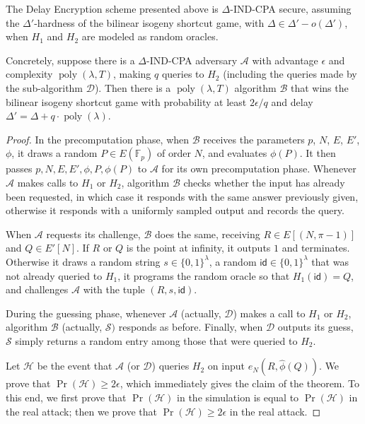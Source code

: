\documentclass{llncs}
\newcommand{\F}{\mathbb{F}}
\DeclareMathOperator{\poly}{poly}
\newcommand{\id}{\mathsf{id}}
\begin{document}
\begin{theorem}
  The Delay Encryption scheme presented above is $\Delta$-IND-CPA
  secure, assuming the $\Delta'$-hardness of the bilinear isogeny
  shortcut game, with $\Delta\in\Delta' - o(\Delta')$, when $H_1$ and
  $H_2$ are modeled as random oracles.

  Concretely, suppose there is a $\Delta$-IND-CPA adversary
  $\mathcal{A}$ with advantage $\epsilon$ and complexity $\poly(\lambda,T)$,
  making $q$ queries
  to $H_2$ (including the queries made by the sub-algorithm
  $\mathcal{D}$). Then there is a $\poly(\lambda,T)$ algorithm $\mathcal{B}$
  that wins the bilinear isogeny shortcut game with probability at
  least $2\epsilon/q$ and delay $\Delta' = \Delta + q\cdot\poly(\lambda)$.
\end{theorem}
\begin{proof}
  In the precomputation phase, when $\mathcal{B}$ receives the
  parameters $p$, $N$, $E$, $E'$, $\phi$, it draws a random $P\in E(\F_p)$ of
  order $N$, and evaluates $\phi(P)$. %
  It then passes $p,N,E,E',\phi,P,\phi(P)$ to $\mathcal{A}$ for its
  own precomputation phase. %
  Whenever $\mathcal{A}$ makes calls to $H_1$ or $H_2$, algorithm
  $\mathcal{B}$ checks whether the input has already been requested,
  in which case it responds with the same answer previously given,
  otherwise it responds with a uniformly sampled output and records
  the query.

  When $\mathcal{A}$ requests its challenge, $\mathcal{B}$ does the
  same, receiving $R\in E[(N,\pi-1)]$ and $Q\in E'[N]$. %
  If $R$ or $Q$ is the point at infinity, it outputs $1$ and
  terminates. %
  Otherwise it draws a random string $s\in\{0,1\}^\lambda$, a random
  $\id\in\{0,1\}^\lambda$ that was not already queried to $H_1$, it
  programs the random oracle so that $H_1(\id) = Q$, and challenges
  $\mathcal{A}$ with the tuple $(R,s,\id)$.

  During the guessing phase, whenever $\mathcal{A}$ (actually,
  $\mathcal{D}$) makes a call to $H_1$ or $H_2$, algorithm $\mathcal{B}$
  (actually, $\mathcal{S})$ responds as before. %
  Finally, when $\mathcal{D}$ outputs its guess, $\mathcal{S}$ simply
  returns a random entry among those that were queried to $H_2$.

  Let $\mathcal{H}$ be the event that $\mathcal{A}$ (or $\mathcal{D}$)
  queries $H_2$ on input $e_N(R,\hat\phi(Q))$. %
  We prove that $\Pr(\mathcal{H}) \ge 2\epsilon$, which immediately
  gives the claim of the theorem. %
  To this end, we first prove that $\Pr(\mathcal{H})$ in the
  simulation is equal to $\Pr(\mathcal{H})$ in the real attack; then
  we prove that $\Pr(\mathcal{H})\ge 2\epsilon$ in the real attack.


\end{proof}
\end{document}
